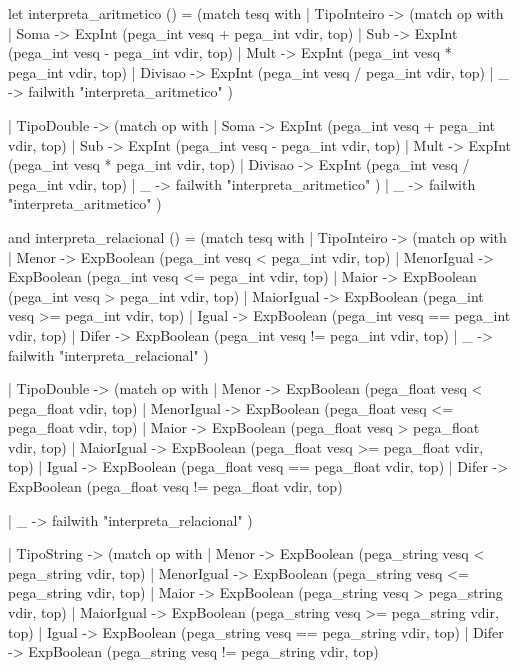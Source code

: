 \documentclass[12pt,a4paper,twoside]{report}
\begin{document}
\begin{terminal}
    let interpreta_aritmetico () =
      (match tesq with
	| TipoInteiro ->
         (match op with
          | Soma ->     ExpInt (pega_int vesq + pega_int vdir, top)
          | Sub -> ExpInt (pega_int vesq - pega_int vdir, top)
          | Mult ->     ExpInt (pega_int vesq * pega_int vdir, top)
          | Divisao  ->      ExpInt (pega_int vesq / pega_int vdir, top)
          | _ -> failwith "interpreta_aritmetico"
         )

       | TipoDouble ->
         (match op with
          | Soma ->     ExpInt (pega_int vesq + pega_int vdir, top)
          | Sub -> ExpInt (pega_int vesq - pega_int vdir, top)
          | Mult ->     ExpInt (pega_int vesq * pega_int vdir, top)
          | Divisao  ->      ExpInt (pega_int vesq / pega_int vdir, top)
          | _ -> failwith "interpreta_aritmetico"
         )
        | _ -> failwith "interpreta_aritmetico"
      )

    and interpreta_relacional () =
      (match tesq with
       | TipoInteiro ->
         (match op with
          | Menor -> ExpBoolean (pega_int vesq < pega_int vdir, top)
	  | MenorIgual -> ExpBoolean (pega_int vesq <= pega_int vdir, top)
          | Maior  -> ExpBoolean (pega_int vesq > pega_int vdir, top)
          | MaiorIgual  -> ExpBoolean (pega_int vesq >= pega_int vdir, top)
          | Igual   -> ExpBoolean (pega_int vesq == pega_int vdir, top)
          | Difer   -> ExpBoolean (pega_int vesq != pega_int vdir, top)
          | _ -> failwith "interpreta_relacional"
         )

       | TipoDouble ->
         (match op with
          | Menor -> ExpBoolean (pega_float vesq < pega_float vdir, top)
	  | MenorIgual -> ExpBoolean (pega_float vesq <= pega_float vdir, top)
          | Maior  -> ExpBoolean (pega_float vesq > pega_float vdir, top)
          | MaiorIgual  -> ExpBoolean (pega_float vesq >= pega_float vdir, top)
          | Igual   -> ExpBoolean (pega_float vesq == pega_float vdir, top)
          | Difer   -> ExpBoolean (pega_float vesq != pega_float vdir, top)

          | _ -> failwith "interpreta_relacional"
         )

       | TipoString ->
         (match op with
          | Menor -> ExpBoolean (pega_string vesq < pega_string vdir, top)
          | MenorIgual -> ExpBoolean (pega_string vesq <= pega_string vdir, top)
          | Maior  -> ExpBoolean (pega_string vesq > pega_string vdir, top)
          | MaiorIgual  -> ExpBoolean (pega_string vesq >= pega_string vdir, top)
          | Igual   -> ExpBoolean (pega_string vesq == pega_string vdir, top)
          | Difer   -> ExpBoolean (pega_string vesq != pega_string vdir, top)


\end{terminal}
\end{document}
